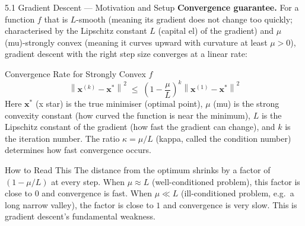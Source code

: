 \documentclass[aspectratio=169,10pt]{beamer}
\newcommand{\vx}{\mathbf{x}}
\newcommand{\norm}[1]{\left\|#1\right\|}
\begin{document}
\begin{frame}[allowframebreaks]{5.1 Gradient Descent --- Motivation and Setup}
  \textbf{Convergence guarantee.}  For a function $f$ that is
  $L$-smooth (meaning its gradient does not change too quickly;
  characterised by the Lipschitz constant $L$ (capital el) of
  the gradient) and $\mu$ (mu)-strongly convex (meaning it
  curves upward with curvature at least $\mu > 0$), gradient
  descent with the right step size converges at a linear rate:

  \begin{block}{Convergence Rate for Strongly Convex $f$}
    \[
      \norm{\vx^{(k)}-\vx^*}^2
      \;\le\;
      \left(1 - \frac{\mu}{L}\right)^k
      \norm{\vx^{(1)}-\vx^*}^2
    \]
    Here $\vx^*$ (x star) is the true minimiser (optimal point),
    $\mu$ (mu) is the strong convexity constant (how curved
    the function is near the minimum), $L$ is the Lipschitz
    constant of the gradient (how fast the gradient can change),
    and $k$ is the iteration number.  The ratio $\kappa = \mu/L$
    (kappa, called the condition number) determines how fast
    convergence occurs.
  \end{block}

  \begin{alertblock}{How to Read This}
    The distance from the optimum shrinks by a factor of
    $(1 - \mu/L)$ at every step.  When $\mu \approx L$
    (well-conditioned problem), this factor is close to $0$
    and convergence is fast.  When $\mu \ll L$ (ill-conditioned
    problem, e.g.\ a long narrow valley), the factor is close
    to $1$ and convergence is very slow.  This is gradient
    descent's fundamental weakness.
  \end{alertblock}

\end{frame}
\end{document}
